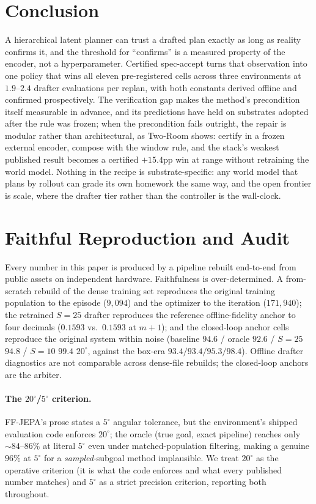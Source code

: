 \documentclass{article}
\newcommand{\degc}[1]{$#1^\circ$}
\begin{document}
\section{Conclusion}
\label{sec:conclusion}
A hierarchical latent planner can trust a drafted plan exactly as long as reality
confirms it, and the threshold for ``confirms'' is a measured property of the
encoder, not a hyperparameter. Certified spec-accept turns that observation into one
policy that wins all eleven pre-registered cells across three environments at
$1.9$--$2.4$ drafter evaluations per replan, with both constants derived offline and
confirmed prospectively. The verification gap makes the method's precondition itself
measurable in advance, and its predictions have held on substrates adopted after
the rule was frozen; when the precondition fails outright, the repair is modular
rather than architectural, as Two-Room shows: certify in a frozen external encoder,
compose with the window rule, and the stack's weakest published result becomes a
certified $+15.4$pp win at range without retraining the world model. Nothing in the
recipe is substrate-specific: any world model that plans by rollout can grade its
own homework the same way, and the open frontier is scale, where the drafter tier
rather than the controller is the wall-clock.

\appendix
\section{Faithful Reproduction and Audit}
\label{app:repro}
Every number in this paper is produced by a pipeline rebuilt end-to-end from public
assets on independent hardware. Faithfulness is over-determined. A from-scratch rebuild
of the dense training set reproduces the original training population to the episode
($9{,}094$) and the optimizer to the iteration ($171{,}940$); the retrained $S{=}25$
drafter reproduces the reference offline-fidelity anchor to four decimals ($0.1593$
vs.\ $0.1593$ at $m{+}1$); and the closed-loop anchor cells reproduce the original
system within noise (baseline $94.6$ / oracle $92.6$ / $S{=}25$ $94.8$ / $S{=}10$
$99.4$ \degc{20}, against the box-era $93.4/93.4/95.3/98.4$). Offline drafter
diagnostics are not comparable across dense-file rebuilds; the closed-loop anchors are
the arbiter.

\paragraph{The \degc{20}/\degc{5} criterion.} FF-JEPA's prose states a \degc{5} angular
tolerance, but the environment's shipped evaluation code enforces \degc{20}; the oracle
(true goal, exact pipeline) reaches only ${\sim}84$--$86\%$ at literal \degc{5} even
under matched-population filtering, making a genuine $96\%$ at \degc{5} for a
\emph{sampled}-subgoal method implausible. We treat \degc{20} as the operative
criterion (it is what the code enforces and what every published number matches) and
\degc{5} as a strict precision criterion, reporting both throughout.
\end{document}

